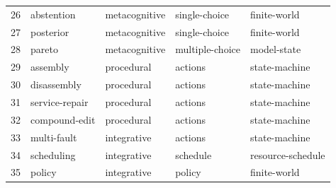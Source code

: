 \begin{center}
\begin{tabular}{rllll}
26 & abstention & metacognitive & single-choice & finite-world \\
27 & posterior & metacognitive & single-choice & finite-world \\
28 & pareto & metacognitive & multiple-choice & model-state \\
29 & assembly & procedural & actions & state-machine \\
30 & disassembly & procedural & actions & state-machine \\
31 & service-repair & procedural & actions & state-machine \\
32 & compound-edit & procedural & actions & state-machine \\
33 & multi-fault & integrative & actions & state-machine \\
34 & scheduling & integrative & schedule & resource-schedule \\
35 & policy & integrative & policy & finite-world \\
\bottomrule\end{tabular}\end{center}
